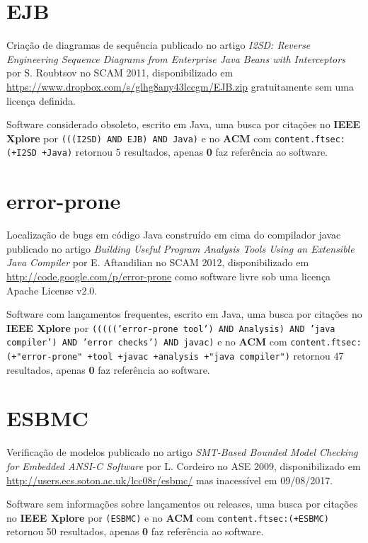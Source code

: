 \section{EJB}

Criação de diagramas de sequência
publicado no artigo {\it I2SD: Reverse Engineering Sequence Diagrams from Enterprise Java Beans with Interceptors}
por S. Roubtsov
no SCAM 2011,
disponibilizado em \url{https://www.dropbox.com/s/glhg8any43lccgm/EJB.zip}
gratuitamente
sem uma licença definida.

Software considerado obsoleto,
escrito em Java,
uma busca por citações no {\bf IEEE Xplore} por
\texttt{(((I2SD) AND EJB) AND Java)}
e no {\bf ACM} com
\texttt{content.ftsec:(+I2SD +Java)}
retornou
5 resultados, apenas
{\bf 0} faz referência ao software.



\section{error-prone}

Localização de bugs em código Java construído em cima do compilador javac
publicado no artigo {\it Building Useful Program Analysis Tools Using an Extensible Java Compiler}
por E. Aftandilian
no SCAM 2012,
disponibilizado em \url{http://code.google.com/p/error-prone}
como software livre
sob uma licença Apache License v2.0.

Software com lançamentos frequentes,
escrito em Java,
uma busca por citações no {\bf IEEE Xplore} por
\texttt{((((('error-prone tool') AND Analysis) AND 'java compiler') AND 'error checks') AND javac)}
e no {\bf ACM} com
\texttt{content.ftsec:(+"error-prone" +tool +javac +analysis +"java compiler")}
retornou
47 resultados, apenas
{\bf 0} faz referência ao software.



\section{ESBMC}

Verificação de modelos
publicado no artigo {\it SMT-Based Bounded Model Checking for Embedded ANSI-C Software}
por L. Cordeiro
no ASE 2009,
disponibilizado em \url{http://users.ecs.soton.ac.uk/lcc08r/esbmc/}
mas inacessível em 09/08/2017.

Software sem informações sobre lançamentos ou releases,
uma busca por citações no {\bf IEEE Xplore} por
\texttt{(ESBMC)}
e no {\bf ACM} com
\texttt{content.ftsec:(+ESBMC)}
retornou
50 resultados, apenas
{\bf 0} faz referência ao software.



